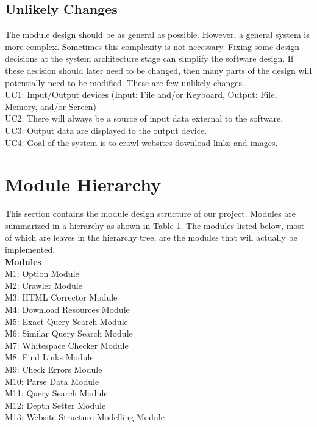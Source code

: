 \documentclass[titlepage]{article}
\begin{document}
\subsection{Unlikely Changes}
The module design should be as general as possible. However, a general system is more complex. Sometimes this complexity is not necessary. Fixing some design decisions at the system architecture stage can simplify the software design. If these decision should later need to be changed, then many parts of the design will potentially need to be modified.
These are few unlikely changes.\\

\noindent
UC1: Input/Output devices (Input: File and/or Keyboard, Output: File, Memory, and/or
Screen)\\
UC2: There will always be a source of input data external to the software.\\
UC3: Output data are displayed to the output device.\\
UC4: Goal of the system is to crawl websites download links and images.\\

\section{Module Hierarchy}
This section contains the module design structure of our project. Modules are summarized in a hierarchy as shown in Table 1. The modules listed below, most of which are leaves in the hierarchy tree, are the modules that will actually be implemented.
\\

\textbf{Modules}\\

\noindent
M1: Option Module\\
M2: Crawler Module\\
M3: HTML Corrector Module\\
M4: Download Resources Module\\
M5: Exact Query Search Module\\
M6: Similar Query Search Module\\
M7: Whitespace Checker Module\\
M8: Find Links Module\\
M9: Check Errors Module\\
M10: Parse Data Module\\
M11: Query Search Module\\
M12: Depth Setter Module\\
M13: Website Structure Modelling Module\\
\end{document}
